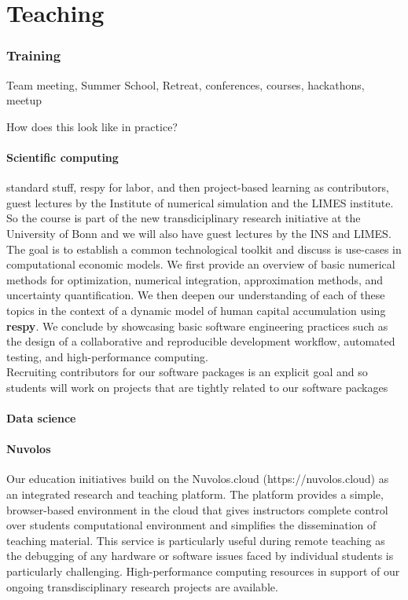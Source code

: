 \section{Teaching}

\subsubsection*{Training} Team meeting, Summer School, Retreat, conferences, courses, hackathons, meetup


How does this look like in practice?

\paragraph{Scientific computing} standard stuff, respy for labor, and then project-based learning as contributors, guest lectures by the Institute of numerical simulation and the LIMES institute. So the course is part of the new transdiciplinary research initiative at the University of Bonn and we will also have guest lectures by the INS and LIMES. The goal is to establish a common technological toolkit and discuss is use-cases in computational economic models. We first provide an overview of basic numerical methods for optimization, numerical integration, approximation methods, and uncertainty quantification. We then deepen our understanding of each of these topics in the context of a dynamic model of human capital accumulation using \textbf{respy}. We conclude by showcasing basic software engineering practices such as the design of a collaborative and reproducible development workflow, automated testing, and high-performance computing.\\

\noindent Recruiting contributors for our software packages is an explicit goal and so students will work on projects that are tightly related to our software packages

\paragraph{Data science}

\paragraph{Nuvolos} Our education initiatives build on the Nuvolos.cloud (https://nuvolos.cloud) as an integrated research and teaching platform. The platform provides a simple, browser-based environment in the cloud that gives instructors complete control over students computational environment and simplifies the dissemination of teaching material. This service is particularly useful during remote teaching as the debugging of any hardware or software issues faced by individual students is particularly challenging. High-performance computing resources in support of our ongoing transdisciplinary research projects are available.
